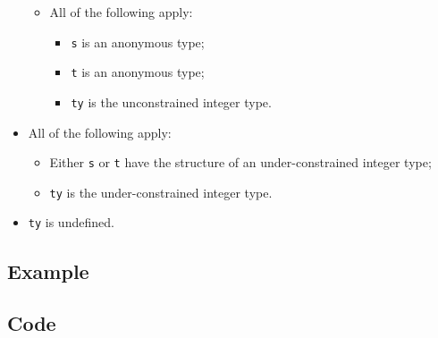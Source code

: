 \documentclass{book}
\begin{document}
\begin{itemize}
\begin{itemize}
      \item All of the following apply:
        \begin{itemize}
        \item \texttt{s} is an anonymous type;
        \item \texttt{t} is an anonymous type;
	\item \texttt{ty} is the unconstrained integer type.
        \end{itemize}
    \end{itemize}

  \item All of the following apply:
    \begin{itemize}
    \item Either \texttt{s} or \texttt{t} have the structure of an under-constrained integer type;
    \item \texttt{ty} is the under-constrained integer type.
    \end{itemize}

  \item \texttt{ty} is undefined.
  \end{itemize}

  \subsection{Example}

  \subsection{Code}
\end{document}
